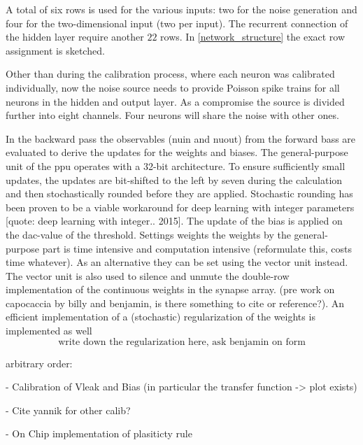 A total of six rows is used for the various inputs: two for the noise generation and four for the two-dimensional input (two per input). The recurrent connection of the hidden layer require another $22$ rows. In \cref{network_structure} the exact row assignment is sketched.

Other than during the calibration process, where each neuron was calibrated individually, now the noise source needs to provide Poisson spike trains for all neurons in the hidden and output layer. As a compromise the source is divided further into eight channels. Four neurons will share the noise with other ones.


In the backward pass the observables (\gls{nuin} and \gls{nuout}) from the forward bass are evaluated to derive the updates for the weights and biases. The general-purpose unit of the \gls{ppu} operates with a 32-bit architecture. To ensure sufficiently small updates, the updates are bit-shifted to the left by seven during the calculation and then stochastically rounded before they are applied. Stochastic rounding has been proven to be a viable workaround for deep learning with integer parameters [quote: 	deep learning with integer.. 2015].
The update of the bias is applied on the \gls{dac}-value of the threshold.
Settings weights the weights by the general-purpose part is time intensive and computation intensive (reformulate this, costs time whatever). As an alternative they can be set using the vector unit instead. The vector unit is also used to silence and unmute the double-row implementation of the continuous weights in the synapse array. (pre work on capocaccia by billy and benjamin, is there something to cite or reference?).
An efficient implementation of a (stochastic) regularization of the weights is implemented as well
\begin{equation}
\text{write down the regularization here, ask benjamin on form}
\end{equation}


arbitrary order:

- Calibration of Vleak and Bias (in particular the transfer function -> plot exists)

- Cite yannik for other calib?

- On Chip implementation of plasiticty rule

